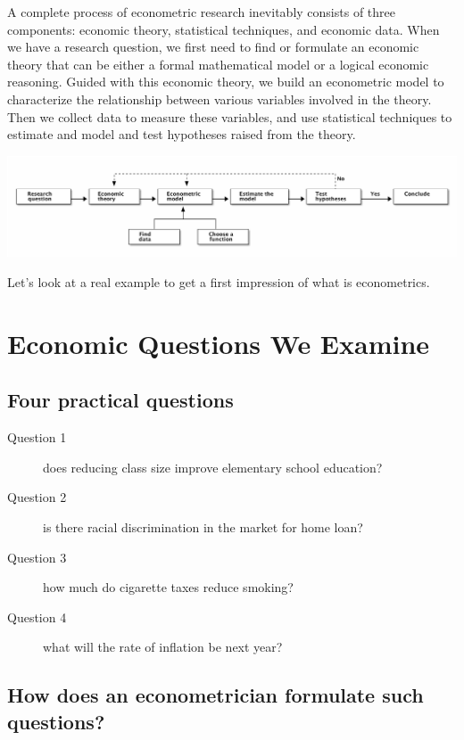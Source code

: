 \documentclass[a4paper,11pt]{article}
\begin{document}
A complete process of econometric research inevitably consists of three
components: economic theory, statistical techniques, and economic
data. When we have a research question, we first need to find or
formulate an economic theory that can be either a formal mathematical
model or a logical economic reasoning. Guided with this economic
theory, we build an econometric model to characterize the relationship
between various variables involved in the theory. Then we collect data
to measure these variables, and use statistical techniques to estimate
and model and test hypotheses raised from the theory.

\begin{center}
\includegraphics[width=1.2\textwidth]{figure/econometric_workflow.png}
\end{center}

Let's look at a real example to get a first impression of what is
econometrics.


\section{Economic Questions We Examine}
\label{sec:org1171ca6}

\subsection{Four practical questions}
\label{sec:orged3da03}

\begin{description}
\item[{Question 1}] does reducing class size improve elementary school education?

\item[{Question 2}] is there racial discrimination in the market for home loan?

\item[{Question 3}] how much do cigarette taxes reduce smoking?

\item[{Question 4}] what will the rate of inflation be next year?
\end{description}


\subsection{How does an econometrician formulate such questions?}
\label{sec:orga44cd5d}
\end{document}
